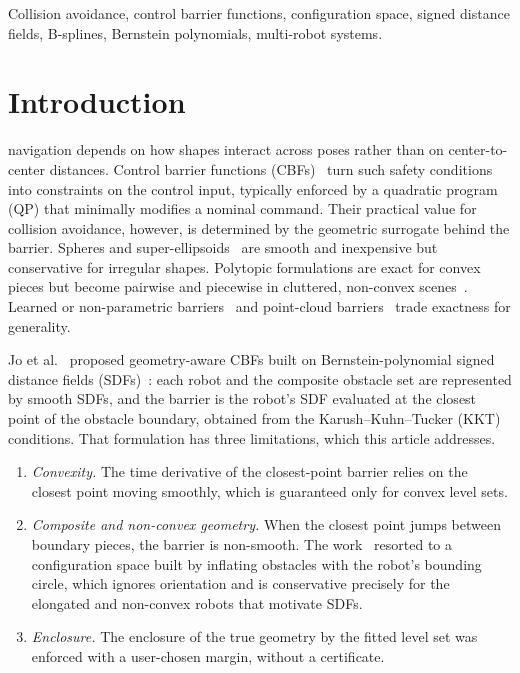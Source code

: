 \documentclass[journal]{IEEEtran}
\theoremstyle{definition}
\begin{document}
\begin{IEEEkeywords}
Collision avoidance, control barrier functions, configuration space, signed distance fields,
B-splines, Bernstein polynomials, multi-robot systems.
\end{IEEEkeywords}

\section{Introduction}\label{sec:intro}

 navigation depends on how shapes interact across poses rather than on
center-to-center distances. Control barrier functions (CBFs)~\cite{ames2019cbf} turn such safety
conditions into constraints on the control input, typically enforced by a quadratic program (QP)
that minimally modifies a nominal command. Their practical value for collision avoidance, however,
is determined by the geometric surrogate behind the barrier. Spheres and
super-ellipsoids~\cite{wang2017safety,wang2017quadrotors} are smooth and inexpensive but
conservative for irregular shapes. Polytopic formulations are exact for convex pieces but become
pairwise and piecewise in cluttered, non-convex scenes~\cite{chen2025minkowski,thirugnanam2025strongly}.
Learned or non-parametric barriers~\cite{khan2022gaussian,long2021learning} and point-cloud
barriers~\cite{dai2024sailing} trade exactness for generality.

Jo et al.~\cite{jo2026geometry} proposed geometry-aware CBFs
built on Bernstein-polynomial signed distance fields (SDFs)~\cite{li2024representing}: each robot
and the composite obstacle set are represented by smooth SDFs, and the barrier is the robot's SDF
evaluated at the closest point of the obstacle boundary, obtained from the Karush--Kuhn--Tucker
(KKT) conditions. That formulation has three limitations, which this article addresses.
\begin{enumerate}
\item[L1)] \emph{Convexity.} The time derivative of the closest-point barrier relies on the
closest point moving smoothly, which is guaranteed only for convex level sets.
\item[L2)] \emph{Composite and non-convex geometry.} When the closest point jumps between boundary
pieces, the barrier is non-smooth. The work~\cite{jo2026geometry} resorted to a configuration space built
by inflating obstacles with the robot's bounding circle, which ignores orientation and is
conservative precisely for the elongated and non-convex robots that motivate SDFs.
\item[L3)] \emph{Enclosure.} The enclosure of the true geometry by the fitted level set was
enforced with a user-chosen margin, without a certificate.
\end{enumerate}
\end{document}
